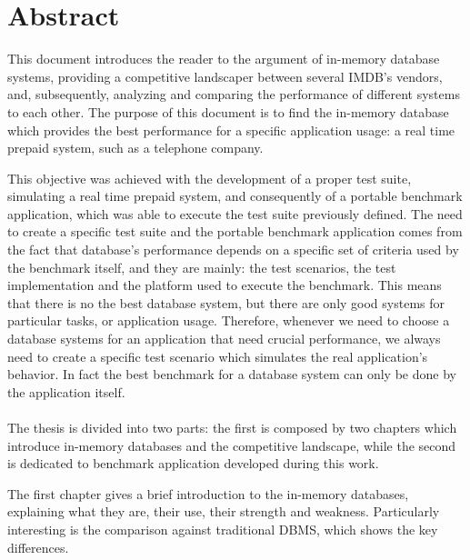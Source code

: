 \chapter{Abstract}


This document introduces the reader to the argument of in-memory database systems, providing a competitive landscaper between several IMDB's vendors, and, subsequently, analyzing and comparing the performance of different systems to each other. 
The purpose of this document is to find the in-memory database which provides the best performance for a specific application usage: a real time prepaid system, such as a telephone company.


This objective was achieved with the development of a proper test suite, simulating a real time prepaid system, and consequently of a portable benchmark application, which was able to execute the test suite previously defined. 
The need to create a specific test suite and the portable benchmark application comes from the fact that database's performance depends on a specific set of criteria used by the benchmark itself, and they are mainly: the test scenarios, the test implementation and the platform used to execute the benchmark.
This means that there is no the best database system, but there are only good systems for particular tasks, or application usage. Therefore, whenever we need to choose a database systems for an application that need crucial performance, we always need to create a specific test scenario which simulates the real application's behavior. In fact the best benchmark for a database system can only be done by the application itself.

\subsubsection{}

The thesis is divided into two parts: the first is composed by two chapters which introduce in-memory databases and the competitive landscape, while the second is dedicated to benchmark application developed during this work.

The first chapter gives a brief introduction to the in-memory databases, explaining what they are, their use, their strength and weakness. Particularly interesting is the comparison against traditional DBMS, which shows the key differences. 

